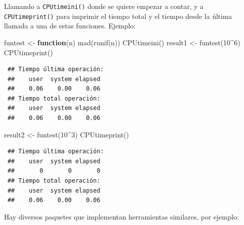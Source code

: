 \documentclass[
]{book}
\newenvironment{Shaded}{\begin{snugshade}}{\end{snugshade}}
\newcommand{\ControlFlowTok}[1]{\textcolor[rgb]{0.13,0.29,0.53}{\textbf{#1}}}
\newcommand{\DecValTok}[1]{\textcolor[rgb]{0.00,0.00,0.81}{#1}}
\newcommand{\FunctionTok}[1]{\textcolor[rgb]{0.00,0.00,0.00}{#1}}
\newcommand{\NormalTok}[1]{#1}
\newcommand{\OtherTok}[1]{\textcolor[rgb]{0.56,0.35,0.01}{#1}}
\newcommand{\SpecialCharTok}[1]{\textcolor[rgb]{0.00,0.00,0.00}{#1}}
\theoremstyle{break}
\theoremstyle{nonumberplain}
\begin{document}
Llamando a \texttt{CPUtimeini()} donde se quiere empezar a contar,
y a \texttt{CPUtimeprint()} para imprimir el tiempo total
y el tiempo desde la última llamada a una de estas funciones.
Ejemplo:

\begin{Shaded}
\begin{Highlighting}[]
\NormalTok{funtest }\OtherTok{\textless{}{-}} \ControlFlowTok{function}\NormalTok{(n) }\FunctionTok{mad}\NormalTok{(}\FunctionTok{runif}\NormalTok{(n)) }
\FunctionTok{CPUtimeini}\NormalTok{()}
\NormalTok{result1 }\OtherTok{\textless{}{-}} \FunctionTok{funtest}\NormalTok{(}\DecValTok{10}\SpecialCharTok{\^{}}\DecValTok{6}\NormalTok{)}
\FunctionTok{CPUtimeprint}\NormalTok{()}
\end{Highlighting}
\end{Shaded}

\begin{verbatim}
 ## Tiempo última operación:
 ##    user  system elapsed 
 ##    0.06    0.00    0.06 
 ## Tiempo total operación:
 ##    user  system elapsed 
 ##    0.06    0.00    0.06
\end{verbatim}

\begin{Shaded}
\begin{Highlighting}[]
\NormalTok{result2 }\OtherTok{\textless{}{-}} \FunctionTok{funtest}\NormalTok{(}\DecValTok{10}\SpecialCharTok{\^{}}\DecValTok{3}\NormalTok{)}
\FunctionTok{CPUtimeprint}\NormalTok{()}
\end{Highlighting}
\end{Shaded}

\begin{verbatim}
 ## Tiempo última operación:
 ##    user  system elapsed 
 ##       0       0       0 
 ## Tiempo total operación:
 ##    user  system elapsed 
 ##    0.06    0.00    0.06
\end{verbatim}

Hay diversos paquetes que implementan herramientas similares, por ejemplo:
\end{document}
